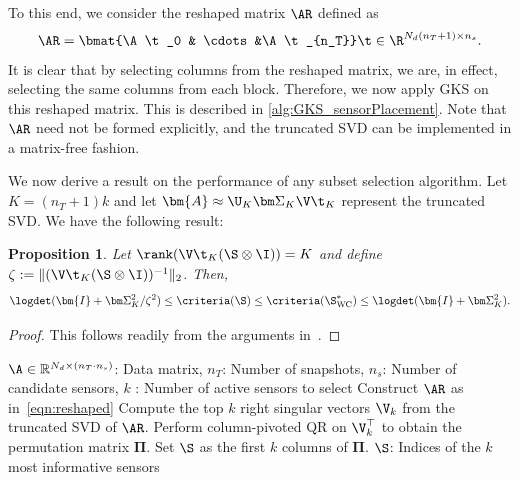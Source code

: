 \documentclass{aims} %
\newtheorem{proposition}[theorem]{Proposition}
\theoremstyle{definition}
\begin{document}
To this end, we consider the reshaped matrix $\AR$ defined as 
\begin{equation}
    \label{eqn:reshaped}
    \AR = \bmat{\A\t_0 & \cdots &\A\t_{n_T}}\t \in \R^{N_d(n_T+1) \times n_s}.
\end{equation}
It is clear that by selecting columns from the reshaped matrix, we are, in effect, selecting the same columns from each block. Therefore, we now apply GKS on this reshaped matrix.
This is described in \cref{alg:GKS_sensorPlacement}. 
 Note that $\AR$ need not be formed explicitly, and the truncated SVD can be implemented in a matrix-free fashion. 



We now derive a result on the performance of any subset selection algorithm. 
Let $K=(n_T+1)k$ and let $\bm{A} \approx \U_K\bm\Sigma_K\V\t_K$ represent the truncated SVD. We have the following result:
\begin{proposition}
    Let $\rank(\V\t_K (\S \otimes  \I)) = K$  and define $\zeta := \| (\V\t_K (\S \otimes  \I))^{-1}\|_2$. Then, 
\begin{equation}\label{eqn:eigbound2}
    \logdet(\bm{I} + \bm\Sigma_K^2/\zeta^2) \le  \criteria(\S) \le \criteria(\S^*_{\rm WC}) \le \logdet(\bm{I} + \bm\Sigma_K^2).
\end{equation}   
\end{proposition}
\begin{proof}
    This follows readily from the arguments in~\cite[Theorem 3.2]{eswar2024bayesian}.
\end{proof}


\begin{algorithm}[!ht]
\caption{Sensor placement using column subset selection}
\label{alg:GKS_sensorPlacement}



\begin{algorithmic}[1]
\Require ${\A} \in \mathbb{R}^{N_d \times (n_T \cdot n_s)}$: Data matrix, $n_T$: Number of snapshots, 
 $n_s$: Number of candidate sensors, 
$k$ : Number of active sensors to select 
\State Construct $\AR$ as in~\eqref{eqn:reshaped}
\State Compute the top \(k\) right singular vectors \(\V_k\) from the truncated SVD of \(\AR\).
\State  Perform column-pivoted QR  on \(\V_k^\top\) to obtain the permutation matrix \(\bm{\Pi}\).
\State Set \(\S\) as the  first \(k\) columns of \(\bm{\Pi}\). 
\State \Return \(\S\): Indices of the $k$ most informative sensors 
\end{algorithmic}
\end{algorithm}
\end{document}
